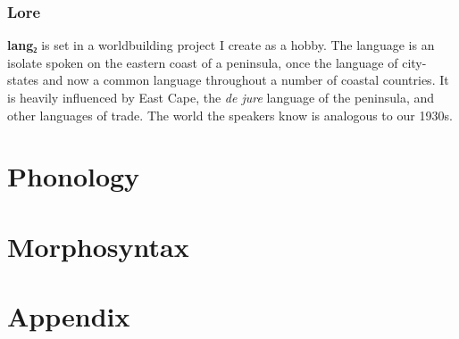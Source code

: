 \documentclass[fontsize=12pt,twoside=false,numbers=noenddot]{class/kaobook}
\newcommand{\langname}{\textbf{lang₂}}
\begin{document}
\section{Lore}
\langname{} is set in a worldbuilding project I create as a hobby. The language is an isolate spoken on the eastern coast of a peninsula, once the language of city-states and now a common language throughout a number of coastal countries. It is heavily influenced by East Cape, the \emph{de jure} language of the peninsula, and other languages of trade. The world the speakers know is analogous to our 1930s.

\mainmatter

 \part{Phonology} 



 \part{Morphosyntax} 









 \part{Appendix} 

\appendix





\backmatter
{}
\end{document}
